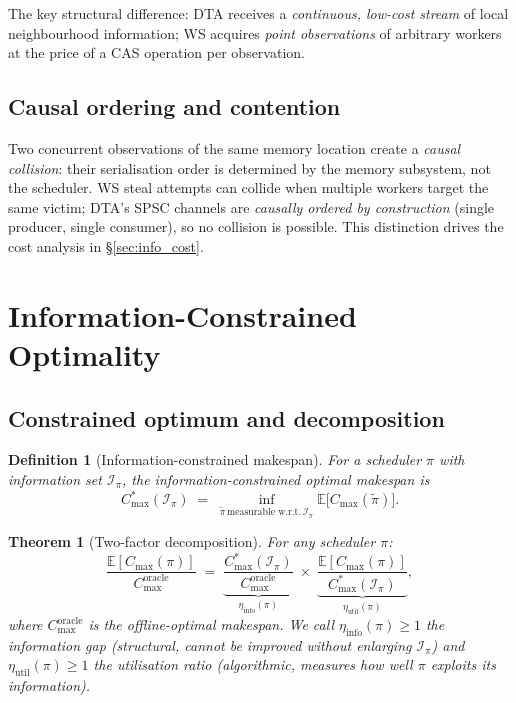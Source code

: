 \documentclass[11pt,a4paper]{report}
\newtheorem{theorem}{Theorem}[section]
\newtheorem{definition}{Definition}[section]
\begin{document}
The key structural difference: DTA receives a \emph{continuous, low-cost
stream} of local neighbourhood information; WS acquires \emph{point
observations} of arbitrary workers at the price of a CAS operation per
observation.

\subsection{Causal ordering and contention}

Two concurrent observations of the same memory location create a
\emph{causal collision}: their serialisation order is determined by the
memory subsystem, not the scheduler.  WS steal attempts can collide when
multiple workers target the same victim; DTA's SPSC channels are
\emph{causally ordered by construction} (single producer, single consumer),
so no collision is possible.  This distinction drives the cost analysis
in \S\ref{sec:info_cost}.

\section{Information-Constrained Optimality}
\label{sec:info_optimality}

\subsection{Constrained optimum and decomposition}

\begin{definition}[Information-constrained makespan]\label{def:Cstar}
For a scheduler $\pi$ with information set $\mathcal{I}_\pi$, the
\emph{information-constrained optimal makespan} is
\[
  C_{\max}^*(\mathcal{I}_\pi)
  \;=\;
  \inf_{\tilde\pi\,\text{measurable w.r.t.}\,\mathcal{I}_\pi}
  \mathbb{E}\bigl[C_{\max}(\tilde\pi)\bigr].
\]
\end{definition}

\begin{theorem}[Two-factor decomposition]\label{thm:decomp}
For any scheduler $\pi$:
\[
  \frac{\mathbb{E}[C_{\max}(\pi)]}{C_{\max}^{\mathrm{oracle}}}
  \;=\;
  \underbrace{\frac{C_{\max}^*(\mathcal{I}_\pi)}{C_{\max}^{\mathrm{oracle}}}}_{\displaystyle\eta_{\mathrm{info}}(\pi)}\;
  \times\;
  \underbrace{\frac{\mathbb{E}[C_{\max}(\pi)]}{C_{\max}^*(\mathcal{I}_\pi)}}_{\displaystyle\eta_{\mathrm{util}}(\pi)},
\]
where $C_{\max}^{\mathrm{oracle}}$ is the offline-optimal makespan.
We call $\eta_{\mathrm{info}}(\pi) \geq 1$ the \emph{information gap} (structural,
cannot be improved without enlarging $\mathcal{I}_\pi$) and
$\eta_{\mathrm{util}}(\pi) \geq 1$ the \emph{utilisation ratio} (algorithmic,
measures how well $\pi$ exploits its information).
\end{theorem}
\end{document}
